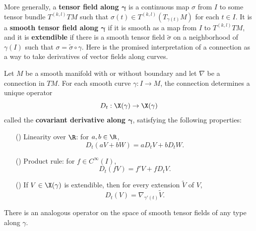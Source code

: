 More generally, a \textbf{tensor field along $\bm{\gamma}$} is a continuous map $\sigma$ 
from $I$ to some tensor bundle $T^{(k,l)}TM$ such that $\sigma(t)\in T^{(k,l)}(T_{\gamma(t)}M)$ 
for each $t\in I$. It is a \textbf{smooth tensor field along $\bm{\gamma}$} if it is smooth 
as a map from $I$ to $T^{(k,l)}TM$, and it is \textbf{extendible} if there is a smooth tensor field 
$\widetilde{\sigma}$ on a neighborhood of $\gamma(I)$ such that $\sigma=\widetilde{\sigma}\circ\gamma$.
Here is the promised interpretation of a connection as a way to take derivatives of vector 
fields along curves.
\begin{theorem}\label{connection derivative curve}
Let $M$ be a smooth manifold with or without boundary and let $\nabla$ be a connection in $TM$. 
For each smooth curve $\gamma:I\to M$, the connection determines a unique operator
\[D_t:\X(\gamma)\to\X(\gamma)\]
called the \textbf{covariant derivative along $\bm{\gamma}$}, satisfying the following 
properties:
\begin{itemize}
\item[(\rmnum{1})] Linearity over $\R$: for $a,b\in\R$,
\[D_t(aV+bW)=aD_tV+bD_tW.\] 
\item[(\rmnum{2})] Product rule: for $f\in C^{\infty}(I)$,
\[D_t(fV)=f'V+fD_tV.\]
\item[(\rmnum{3})] If $V\in\X(\gamma)$ is extendible, then for every extension $\widetilde{V}$ of $V$,
\[D_t(V)=\nabla_{\gamma'(t)}\widetilde{V}.\] 
\end{itemize}
There is an analogous operator on the space of smooth tensor fields of any type along $\gamma$.
\end{theorem}
